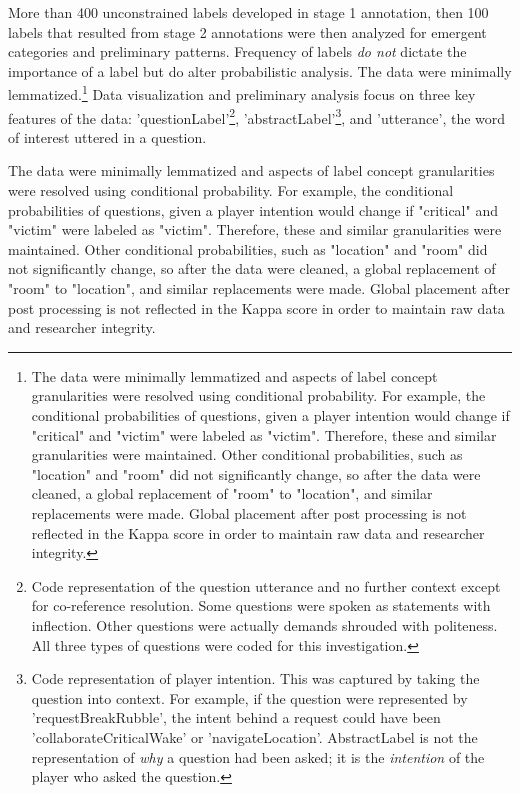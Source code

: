 More than 400 unconstrained labels developed in stage 1 annotation, then 100 labels that resulted from stage 2 annotations were then analyzed for emergent categories and preliminary patterns. Frequency of labels \emph{do not} dictate the importance of a label but do alter probabilistic analysis. The data were minimally lemmatized.\footnote{The data were minimally lemmatized and aspects of label concept granularities were resolved using conditional probability. For example, the conditional probabilities of questions, given a player intention would change if "critical" and "victim" were labeled as "victim". Therefore, these and similar granularities were maintained. Other conditional probabilities, such as "location" and "room" did not significantly change, so after the data were cleaned, a global replacement of "room" to "location", and similar replacements were made. Global placement after post processing is not reflected in the Kappa score in order to maintain raw data and researcher integrity.} Data visualization and preliminary analysis focus on three key features of the data: 'questionLabel'\footnote{Code representation of the question utterance and no further context except for co-reference resolution. Some questions were spoken as statements with inflection. Other questions were actually demands shrouded with politeness. All three types of questions were coded for this investigation.}, 'abstractLabel'\footnote{Code representation of player intention. This was captured by taking the question into context. For example, if the question were represented by 'requestBreakRubble', the intent behind a request could have been 'collaborateCriticalWake' or 'navigateLocation'. AbstractLabel is not the representation of \emph{why} a question had been asked; it is the \emph{intention} of the player who asked the question.}, and 'utterance', the word of interest uttered in a question.

The data were minimally lemmatized and aspects of label concept granularities were resolved using conditional probability. For example, the conditional probabilities of questions, given a player intention would change if "critical" and "victim" were labeled as "victim". Therefore, these and similar granularities were maintained. Other conditional probabilities, such as "location" and "room" did not significantly change, so after the data were cleaned, a global replacement of "room" to "location", and similar replacements were made. Global placement after post processing is not reflected in the Kappa score in order to maintain raw data and researcher integrity.

